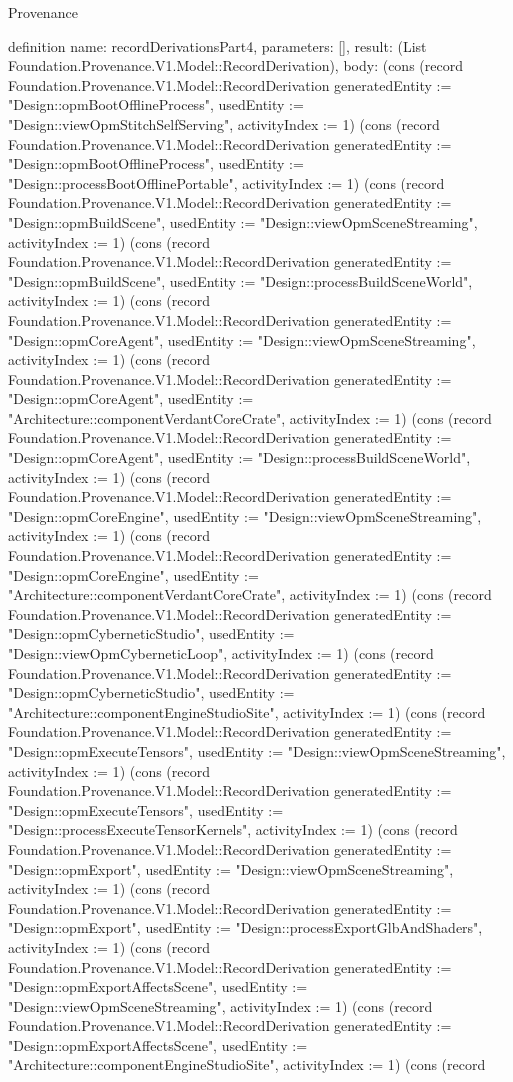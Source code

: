 \begin{lexlean}{Provenance}
\begin{semanticmodule}
definition{
  name: recordDerivationsPart4,
  parameters: [],
  result: (List Foundation.Provenance.V1.Model::RecordDerivation),
  body: (cons (record Foundation.Provenance.V1.Model::RecordDerivation {generatedEntity := "Design::opmBootOfflineProcess", usedEntity := "Design::viewOpmStitchSelfServing", activityIndex := 1}) (cons (record Foundation.Provenance.V1.Model::RecordDerivation {generatedEntity := "Design::opmBootOfflineProcess", usedEntity := "Design::processBootOfflinePortable", activityIndex := 1}) (cons (record Foundation.Provenance.V1.Model::RecordDerivation {generatedEntity := "Design::opmBuildScene", usedEntity := "Design::viewOpmSceneStreaming", activityIndex := 1}) (cons (record Foundation.Provenance.V1.Model::RecordDerivation {generatedEntity := "Design::opmBuildScene", usedEntity := "Design::processBuildSceneWorld", activityIndex := 1}) (cons (record Foundation.Provenance.V1.Model::RecordDerivation {generatedEntity := "Design::opmCoreAgent", usedEntity := "Design::viewOpmSceneStreaming", activityIndex := 1}) (cons (record Foundation.Provenance.V1.Model::RecordDerivation {generatedEntity := "Design::opmCoreAgent", usedEntity := "Architecture::componentVerdantCoreCrate", activityIndex := 1}) (cons (record Foundation.Provenance.V1.Model::RecordDerivation {generatedEntity := "Design::opmCoreAgent", usedEntity := "Design::processBuildSceneWorld", activityIndex := 1}) (cons (record Foundation.Provenance.V1.Model::RecordDerivation {generatedEntity := "Design::opmCoreEngine", usedEntity := "Design::viewOpmSceneStreaming", activityIndex := 1}) (cons (record Foundation.Provenance.V1.Model::RecordDerivation {generatedEntity := "Design::opmCoreEngine", usedEntity := "Architecture::componentVerdantCoreCrate", activityIndex := 1}) (cons (record Foundation.Provenance.V1.Model::RecordDerivation {generatedEntity := "Design::opmCyberneticStudio", usedEntity := "Design::viewOpmCyberneticLoop", activityIndex := 1}) (cons (record Foundation.Provenance.V1.Model::RecordDerivation {generatedEntity := "Design::opmCyberneticStudio", usedEntity := "Architecture::componentEngineStudioSite", activityIndex := 1}) (cons (record Foundation.Provenance.V1.Model::RecordDerivation {generatedEntity := "Design::opmExecuteTensors", usedEntity := "Design::viewOpmSceneStreaming", activityIndex := 1}) (cons (record Foundation.Provenance.V1.Model::RecordDerivation {generatedEntity := "Design::opmExecuteTensors", usedEntity := "Design::processExecuteTensorKernels", activityIndex := 1}) (cons (record Foundation.Provenance.V1.Model::RecordDerivation {generatedEntity := "Design::opmExport", usedEntity := "Design::viewOpmSceneStreaming", activityIndex := 1}) (cons (record Foundation.Provenance.V1.Model::RecordDerivation {generatedEntity := "Design::opmExport", usedEntity := "Design::processExportGlbAndShaders", activityIndex := 1}) (cons (record Foundation.Provenance.V1.Model::RecordDerivation {generatedEntity := "Design::opmExportAffectsScene", usedEntity := "Design::viewOpmSceneStreaming", activityIndex := 1}) (cons (record Foundation.Provenance.V1.Model::RecordDerivation {generatedEntity := "Design::opmExportAffectsScene", usedEntity := "Architecture::componentEngineStudioSite", activityIndex := 1}) (cons (record }
\end{semanticmodule}
\end{lexlean}
